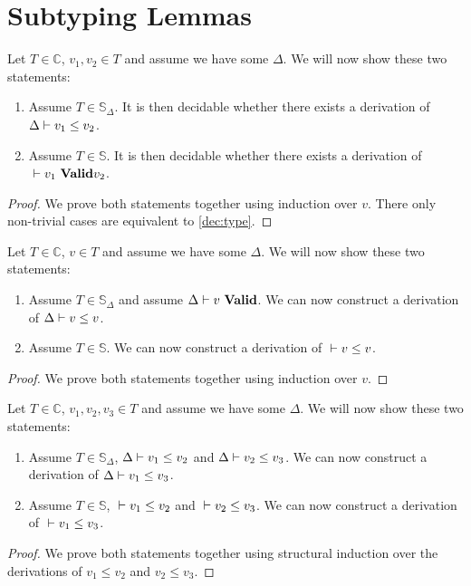 \section{Subtyping Lemmas}


\begin{lemma}
  Let $T \in \mathbb{C}$, $v_1, v_2 \in T$ and assume we have some $\Delta$. We
  will now show these two statements:
  \begin{enumerate}
  \item Assume $T \in \mathbb{S}_\Delta$. It is then decidable whether there
    exists a derivation of ${\Delta} |- {v_1} \le {v_2}$.
  \item Assume $T \in \mathbb{S}$. It is then decidable whether there exists a
    derivation of ${} |- {v_1}\ \mathbf{Valid}{v_2}$.
  \end{enumerate}
\end{lemma}
\label{dec:subtype}
\begin{proof}
  We prove both statements together using induction over $v$. There only
  non-trivial cases are equivalent to \autoref{dec:type}.
\end{proof}

\begin{lemma}
  Let $T \in \mathbb{C}$, $v \in T$ and assume we have some $\Delta$. We
  will now show these two statements:
  \begin{enumerate}
  \item Assume $T \in \mathbb{S}_\Delta$ and assume ${\Delta} |- {v}\ \mathbf{Valid}$. We can
    now construct a derivation of ${\Delta} |- {v} \le {v}$.
  \item Assume $T \in \mathbb{S}$. We can now construct a derivation of
    ${} |- {v} \le {v}$.
  \end{enumerate}
\end{lemma}
\begin{proof}
  We prove both statements together using induction over $v$.
\end{proof}

\begin{lemma}
  Let $T \in \mathbb{C}$, $v_1, v_2, v_3 \in T$ and assume we have some
  $\Delta$. We will now show these two statements:
  \begin{enumerate}
  \item Assume $T \in \mathbb{S}_\Delta$, ${\Delta} |- {v_1} \le {v_2}$ and
    ${\Delta} |- {v_2} \le {v_3}$. We can now construct a derivation of
    ${\Delta} |- {v_1} \le {v_3}$.
  \item Assume $T \in \mathbb{S}$, ${} |- {v_1} \le {v_2}$ and
    ${} |- {v_2} \le {v_3}$. We can now construct a derivation of
    ${} |- {v_1} \le {v_3}$.
  \end{enumerate}
\end{lemma}
\begin{proof}
  We prove both statements together using structural induction over the
  derivations of $v_1\le v_2$ and $v_2 \le v_3$.
\end{proof}

